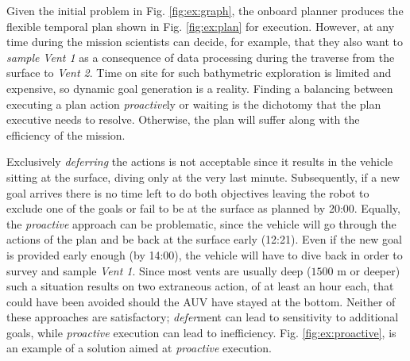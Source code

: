 Given the initial problem in Fig. \ref{fig:ex:graph}, the onboard
planner produces the flexible temporal plan shown in
Fig. \ref{fig:ex:plan} for execution. However, at any time during the
mission scientists can decide, for example, that they also want to
{\em sample} {\em Vent 1} as a consequence of data processing during
the traverse from the surface to {\em Vent 2}.  Time on site for such
bathymetric exploration is limited and expensive, so dynamic goal
generation is a reality.  Finding a balancing between executing a plan
action \emph{proactive}ly or waiting is the dichotomy that the plan
executive needs to resolve. Otherwise, the plan will suffer along with
the efficiency of the mission.



Exclusively {\em deferring} the actions is not acceptable since it
results in the vehicle sitting at the surface, diving only at the very
last minute. Subsequently, if a new goal arrives there is no time left
to do both objectives leaving the robot to exclude one of the goals or
fail to be at the surface as planned by 20:00. Equally, the {\em
  proactive} approach can be problematic, since the vehicle will go
through the actions of the plan and be back at the surface early
(12:21). Even if the new goal is provided early enough (by 14:00), the
vehicle will have to dive back in order to survey and sample {\em
  Vent 1}.
Since most vents are usually deep ($1500$ m or deeper) such a
situation results on two extraneous action, of at least an hour each,
that could have been avoided should the AUV have stayed at the bottom.
Neither of these approaches are satisfactory; {\em defer}ment can lead to
sensitivity to additional goals, while \emph{proactive} execution
can lead to inefficiency.  Fig. \ref{fig:ex:proactive}, is an example of a
solution aimed at \emph{proactive} execution.

